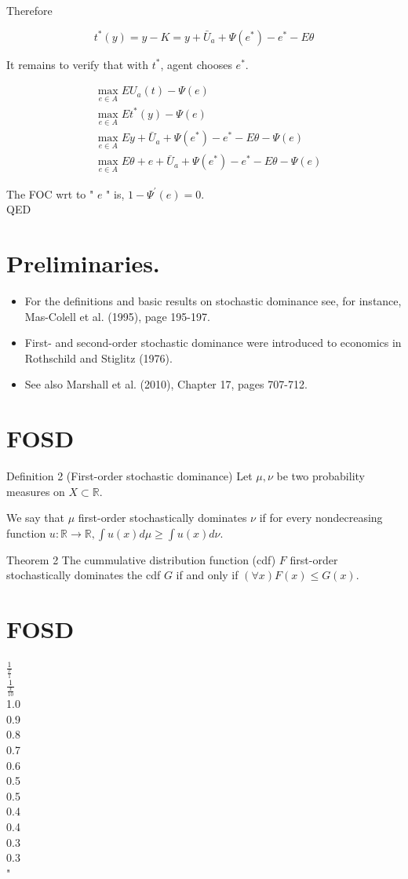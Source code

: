 \documentclass[10pt]{article}
\begin{document}
Therefore

$$
t^{*}(y)=y-K=y+\bar{U}_{a}+\Psi\left(e^{*}\right)-e^{*}-E \theta
$$

It remains to verify that with $t^{*}$, agent chooses $e^{*}$.

$$
\begin{aligned}
& \max _{e \in A} E U_{a}(t)-\Psi(e) \\
& \max _{e \in A} E t^{*}(y)-\Psi(e) \\
& \max _{e \in A} E y+\bar{U}_{a}+\Psi\left(e^{*}\right)-e^{*}-E \theta-\Psi(e) \\
& \max _{e \in A} E \theta+e+\bar{U}_{a}+\Psi\left(e^{*}\right)-e^{*}-E \theta-\Psi(e)
\end{aligned}
$$

The FOC wrt to " $e$ " is, $1-\Psi^{\prime}(e)=0$.\\
QED

\section*{Preliminaries.}
\begin{itemize}
  \item For the definitions and basic results on stochastic dominance see, for instance, Mas-Colell et al. (1995), page 195-197.
  \item First- and second-order stochastic dominance were introduced to economics in Rothschild and Stiglitz (1976).
  \item See also Marshall et al. (2010), Chapter 17, pages 707-712.
\end{itemize}

\section*{FOSD}
Definition 2 (First-order stochastic dominance) Let $\mu, \nu$ be two probability measures on $X \subset \mathbb{R}$.

We say that $\mu$ first-order stochastically dominates $\nu$ if for every nondecreasing function $u: \mathbb{R} \rightarrow \mathbb{R}, \int u(x) d \mu \geq \int u(x) d \nu$.

Theorem 2 The cummulative distribution function (cdf) $F$ first-order stochastically dominates the cdf $G$ if and only if $(\forall x) F(x) \leq G(x)$.

\section*{FOSD}
$\frac{1}{\frac{x}{1}}$\\
$\frac{1}{\frac{x}{10}}$\\
1.0\\
0.9\\
0.8\\
0.7\\
0.6\\
0.5\\
0.5\\
0.4\\
0.4\\
0.3\\
0.3\\
"
\end{document}
